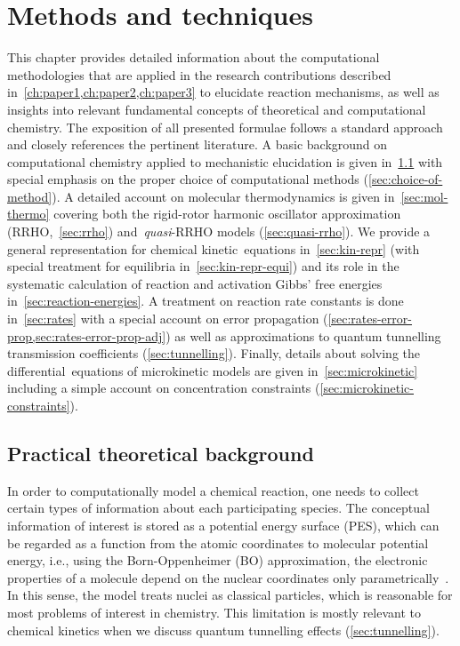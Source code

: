 \chapter{Methods and techniques}%
\label{ch:methods}

This chapter provides detailed information about the computational methodologies that are applied in the research contributions described in~\cref{ch:paper1,ch:paper2,ch:paper3} to elucidate reaction mechanisms,
as well as insights into relevant fundamental concepts of theoretical and computational chemistry.
The exposition of all presented formulae follows a standard approach and closely references the pertinent literature.
A basic background on computational chemistry applied to mechanistic elucidation is given in~\cref{sec:background-methods} with special emphasis on the proper choice of computational methods (\cref{sec:choice-of-method}).
A detailed account on molecular thermodynamics is given in~\cref{sec:mol-thermo} covering both the rigid-rotor harmonic oscillator approximation (RRHO,~\cref{sec:rrho}) and~\emph{quasi}-RRHO models (\cref{sec:quasi-rrho}).
We provide a general representation for chemical kinetic~equations in~\cref{sec:kin-repr} (with special treatment for equilibria in~\cref{sec:kin-repr-equi}) and its role in the systematic calculation of reaction and activation Gibbs' free energies in~\cref{sec:reaction-energies}.
A treatment on reaction rate constants is done in~\cref{sec:rates} with a special account on error propagation (\cref{sec:rates-error-prop,sec:rates-error-prop-adj}) as well as approximations to quantum tunnelling transmission coefficients (\cref{sec:tunnelling}).
Finally,
details about solving the differential~equations of microkinetic models are given in~\cref{sec:microkinetic} including a simple account on concentration constraints (\cref{sec:microkinetic-constraints}).

\section{Practical theoretical background}%
\label{sec:background-methods}

In order to computationally model a chemical reaction,
one needs to collect certain types of information about each participating species.
The conceptual information of interest is stored as a potential energy surface (PES),
which can be regarded as a function from the atomic coordinates to molecular potential energy,
i.e.,
using the Born-Oppenheimer (BO) approximation,
the electronic properties of a molecule depend on the nuclear coordinates only parametrically~\cite{Born_1927}.
In this sense,
the model treats nuclei as classical particles,
which is reasonable for most problems of interest in chemistry.
This limitation is mostly relevant to chemical kinetics when we discuss quantum tunnelling effects (\cref{sec:tunnelling}).

